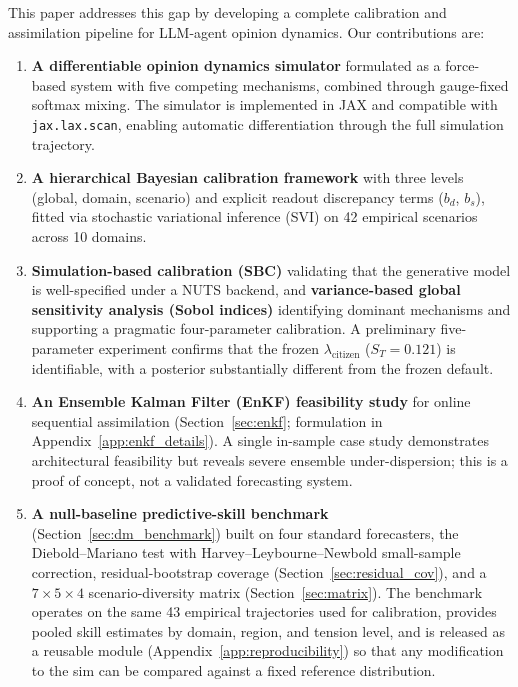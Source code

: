 \documentclass[12pt]{article}
\begin{document}
This paper addresses this gap by developing a complete calibration and assimilation pipeline for LLM-agent opinion dynamics. Our contributions are:

\begin{enumerate}
    \item \textbf{A differentiable opinion dynamics simulator} formulated as a force-based system with five competing mechanisms, combined through gauge-fixed softmax mixing. The simulator is implemented in JAX and compatible with \texttt{jax.lax.scan}, enabling automatic differentiation through the full simulation trajectory.

    \item \textbf{A hierarchical Bayesian calibration framework} with three levels (global, domain, scenario) and explicit readout discrepancy terms ($b_d$, $b_s$), fitted via stochastic variational inference (SVI) on 42 empirical scenarios across 10 domains.

    \item \textbf{Simulation-based calibration (SBC)} validating that the generative model is well-specified under a NUTS backend, and \textbf{variance-based global sensitivity analysis (Sobol indices)} identifying dominant mechanisms and supporting a pragmatic four-parameter calibration. A preliminary five-parameter experiment confirms that the frozen $\lambda_{\text{citizen}}$ ($S_T = 0.121$) is identifiable, with a posterior substantially different from the frozen default.

    \item \textbf{An Ensemble Kalman Filter (EnKF) feasibility study} for online sequential assimilation (Section~\ref{sec:enkf}; formulation in Appendix~\ref{app:enkf_details}). A single in-sample case study demonstrates architectural feasibility but reveals severe ensemble under-dispersion; this is a proof of concept, not a validated forecasting system.

    \item \textbf{A null-baseline predictive-skill benchmark} (Section~\ref{sec:dm_benchmark}) built on four standard forecasters, the Diebold--Mariano test with Harvey--Leybourne--Newbold small-sample correction, residual-bootstrap coverage (Section~\ref{sec:residual_cov}), and a $7 \times 5 \times 4$ scenario-diversity matrix (Section~\ref{sec:matrix}). The benchmark operates on the same 43 empirical trajectories used for calibration, provides pooled skill estimates by domain, region, and tension level, and is released as a reusable module (Appendix~\ref{app:reproducibility}) so that any modification to the sim can be compared against a fixed reference distribution.
\end{enumerate}
\end{document}
